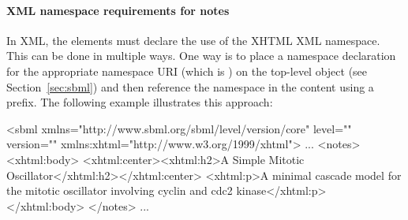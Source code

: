 


\paragraph{XML namespace requirements for notes}

In XML, the  elements must declare the use of
the XHTML XML namespace.  This can be done in multiple ways.  One
way is to place a namespace declaration for the appropriate
namespace URI (which is ) on the
top-level \SBML object (see Section~\ref{sec:sbml}) and then
reference the namespace in the  content using a
prefix.  The following example illustrates this approach:

\begin{example}
<sbml xmlns="http://www.sbml.org/sbml/level\sbmllevel/version\sbmlversionnum/core" level="\sbmllevel" version="\sbmlversionnum"
      xmlns:xhtml="http://www.w3.org/1999/xhtml">
  ...
  <notes>
    <xhtml:body>
      <xhtml:center><xhtml:h2>A Simple Mitotic Oscillator</xhtml:h2></xhtml:center>
      <xhtml:p>A minimal cascade model for the mitotic oscillator
      involving cyclin and cdc2 kinase</xhtml:p>
    </xhtml:body>
  </notes>
  ...
\end{example}

